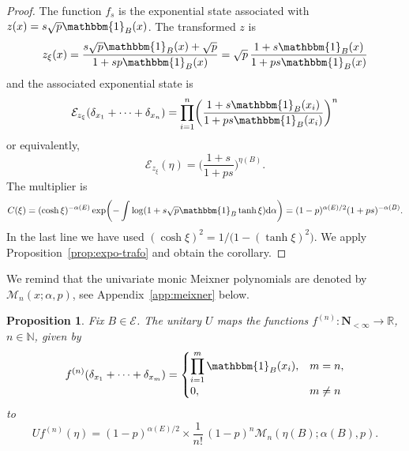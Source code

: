 \documentclass[pdftex]{sigma}
\numberwithin{equation}{section}
\newtheorem{Proposition}[Theorem]{Proposition}
 { \theoremstyle{definition}
\newtheorem{Definition}[Theorem]{Definition}
\newtheorem{Example}[Theorem]{Example}
\newtheorem{Remark}[Theorem]{Remark}
}
\newcommand{\N}{\mathbb{N}}
\newcommand{\R}{\mathbb{R}}
\newcommand{\dd}{\mathrm{d}} %
\newcommand{\1}{\mathbbm{1}}
\begin{document}
\begin{proof}
	The function $f_s$ is the exponential state associated with $z(x) = s \sqrt p \1_B(x)$. The transformed $z$ is
	\[
		z_\xi(x) =\frac{s\sqrt p \1_B(x) + \sqrt p}{1+s p \1_B(x)} = \sqrt p\, \frac{1+s \1_B (x)}{1+ps\1_B (x)}
	\]
	and the associated exponential state is
	\[
		\mathcal E_{z_\xi}(\delta_{x_1}+\cdots +\delta_{x_n})
		= \prod_{i=1}^n \biggl( \frac{1+s \1_B (x_i)}{1+ps\1_B (x_i)}\biggr)^n
	\] 	
	or equivalently,
	\[
		\mathcal E_{z_\xi}(\eta)
		= \biggl( \frac{1+s}{1+ps}\biggr)^{\eta(B)}.
	\] 	
	The multiplier is
	\begin{align*}
	 C(\xi) = (\cosh \xi)^{-\alpha(E)} \exp\biggl( - \int \log (1+ s\sqrt p \1_B \tanh \xi )\dd\alpha\biggr)
	 = (1- p)^{\alpha(E)/2} ( 1+ ps)^{-\alpha(B)}.
	\end{align*}
	In the last line we have used $(\cosh \xi)^2 = 1/\bigl(1- (\tanh \xi)^2\bigr)$. We apply Proposition~\ref{prop:expo-trafo} and obtain the corollary.
\end{proof}


We remind %
that the univariate monic Meixner polynomials are denoted by $\mathcal{M}_n(x; \alpha, p)$, see Appendix~\ref{app:meixner} below.

\begin{Proposition} \label{prop:meixner}
	Fix $B\in \mathcal E$.
	The unitary $U$ maps the functions $f^{(n)}\colon \mathbf N_{<\infty}\to \R$, $n\in \N$, given by
	\[
		f^{(n)}(\delta_{x_1}+\cdots + \delta_{x_m}) = \begin{cases}
			\displaystyle \prod_{i=1}^m \1_B(x_i), & m =n,\\
			 0,& m\neq n
			\end{cases}
	\]
	to
	\[
		U f^{(n)} (\eta) = (1-p)^{\alpha(E)/2}\times \frac{1}{n!}\, (1-p)^n \mathcal M_n(\eta(B);\alpha(B),p).
	\]
\end{Proposition}
\end{document}
